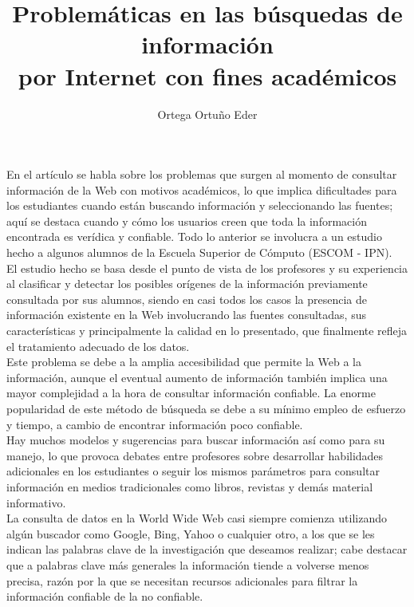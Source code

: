 \documentclass{article}
\title{Problemáticas en las búsquedas de información \\por Internet con fines académicos}
\author{Ortega Ortu\~no Eder}
\date{} %
\begin{document}
	\maketitle
	\normalsize{
En el artículo se habla sobre los problemas que surgen al momento de consultar información de la Web con motivos académicos, lo que implica dificultades para los estudiantes cuando están buscando información y seleccionando las fuentes; aquí se destaca cuando y cómo los usuarios creen que toda la información encontrada es verídica y confiable. Todo lo anterior se involucra a un estudio hecho a algunos alumnos de la Escuela Superior de Cómputo (ESCOM - IPN).
\\

El estudio hecho se basa desde el punto de vista de los profesores y su experiencia al clasificar y detectar los posibles orígenes de la información previamente consultada por sus alumnos, siendo en casi todos los casos la presencia de información existente en la Web involucrando las fuentes consultadas, sus características y principalmente la calidad en lo presentado, que finalmente refleja el tratamiento adecuado de los datos.
\\

Este problema se debe a la amplia accesibilidad que permite la Web a la información, aunque el eventual aumento de información también implica una mayor complejidad a la hora de consultar información confiable. La enorme popularidad de este método de búsqueda se debe a su mínimo empleo de esfuerzo y tiempo, a cambio de encontrar información poco confiable.
\\

Hay muchos modelos y sugerencias para buscar información así como para su manejo, lo que provoca debates entre profesores sobre desarrollar habilidades adicionales en los estudiantes o seguir los mismos parámetros para consultar información en medios tradicionales como libros, revistas y demás material informativo.
\\

La consulta de datos en la World Wide Web casi siempre comienza utilizando algún buscador como Google, Bing, Yahoo o cualquier otro, a los que se les indican las palabras clave de la investigación que deseamos realizar; cabe destacar que a palabras clave más generales la información tiende a volverse menos precisa, razón por la que se necesitan recursos adicionales para filtrar la información confiable de la no confiable.
\\

}
\end{document}
